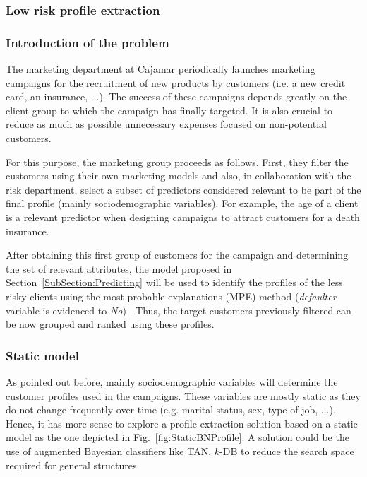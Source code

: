 \subsubsection{Low risk profile extraction}
\subsubsection*{Introduction of the problem}

The marketing department at Cajamar periodically launches marketing campaigns for the recruitment of new products by customers (i.e. a new credit card, an insurance, ...). The success of these campaigns depends greatly on the client group to which the campaign has finally targeted. It is also crucial to reduce as much as possible unnecessary expenses focused on non-potential customers. 

For this purpose, the marketing group proceeds as follows. First, they filter the customers using their own marketing models and also, in collaboration with the risk department, select a subset of predictors considered relevant to be part of the final profile (mainly sociodemographic variables). For example, the age of a client is a relevant predictor when designing campaigns to attract customers for a death insurance. 

After obtaining this first group of customers for the campaign and determining the set of relevant attributes, the model proposed in Section~\ref{SubSection:Predicting} will be used to identify the profiles of the less risky clients using the most probable explanations (MPE) method (\emph{defaulter} variable is evidenced to \emph{No}) . Thus, the target customers previously filtered can be now grouped and ranked using these profiles.


\subsubsection*{Static model}

As pointed out before, mainly sociodemographic variables will determine the customer profiles used in the campaigns. These variables are mostly static as they do not change frequently over time (e.g. marital status, sex, type of job, ...). Hence, it has more sense to explore a profile extraction solution based on a static model as the one depicted in Fig.~\ref{fig:StaticBNProfile}. A solution could be the use of augmented Bayesian classifiers like TAN, $k$-DB to reduce the search space required for general structures. 


